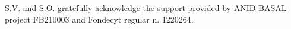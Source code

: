 \documentclass[baaa]{baaa}
\begin{document}

\begin{acknowledgement}
S.V. and S.O. gratefully acknowledge the support provided by ANID BASAL project FB210003 and
Fondecyt regular n. 1220264.
\end{acknowledgement}



\small



\clearpage
\end{document}
